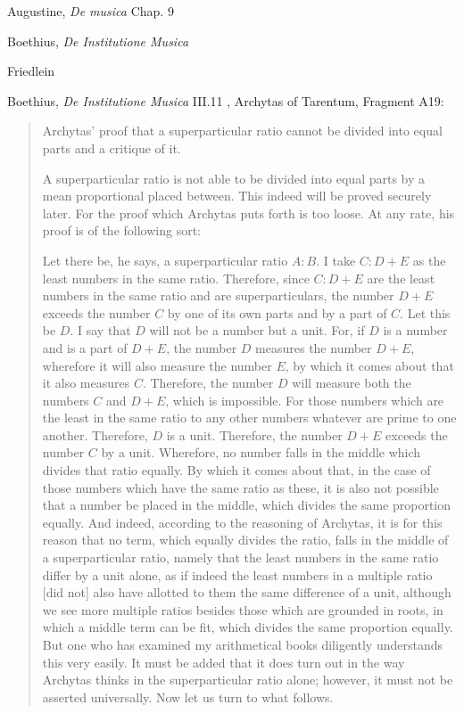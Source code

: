 \documentclass{article}
\theoremstyle{definition}
\begin{document}
Augustine, {\em De musica} Chap. 9 \cite{taliaferro}

Boethius, {\em De Institutione Musica} \cite{bower}

Friedlein \cite{friedlein}

Boethius, {\em De Institutione Musica} III.11 \cite[pp.~451--470]{archytas}, Archytas of Tarentum, Fragment A19: 

\begin{quote}
Archytas' proof that a superparticular ratio cannot be divided into equal parts and a critique of it.

A superparticular ratio is not able to be divided into equal parts by a mean proportional placed between. This indeed will be proved securely later. For the proof which Archytas puts forth is too loose. At any rate, his proof is of the following sort:

Let there be, he says, a superparticular ratio $A:B$. I take $C:D + E$ as the least numbers in the same ratio. Therefore, since $C:D + E$ are the least numbers
in the same ratio and are superparticulars, the number $D + E$ exceeds the number $C$ by one of its own parts and by a part of $C$. Let this be $D$. I say that $D$ will not be a number but a unit. For, if $D$ is a number and is a part of $D + E$, the number $D$ measures the number $D + E$, wherefore it will also measure the number $E$, by which it comes about that it also measures $C$. Therefore, the number $D$ will measure both the numbers $C$ and $D + E$, which is impossible. For those numbers which are the least in the same ratio to any other numbers whatever are prime to one another. Therefore, $D$ is a unit. Therefore, the number $D + E$ exceeds the number $C$ by a unit. Wherefore, no number falls in the middle which divides that ratio equally. By which it comes about that, in the case of those numbers which have the same ratio as these, it is also not possible that a number be placed in the middle, which divides the same proportion equally.
And indeed, according to the reasoning of Archytas, it is for this reason that no term, which equally divides the ratio, falls in the middle of a superparticular ratio, namely that the least numbers in the same ratio differ by a unit alone, as if indeed the least numbers in a multiple ratio [did not] also have allotted to them the same difference of a unit, although we see more multiple ratios besides those which are grounded in roots, in which a middle term can be fit, which divides the same proportion equally. But one who has examined my arithmetical books diligently understands this very easily. It must be added that it does turn out in the way Archytas thinks in the superparticular ratio alone; however, it must not be asserted universally. Now let us turn to what follows.
\end{quote}
\end{document}
